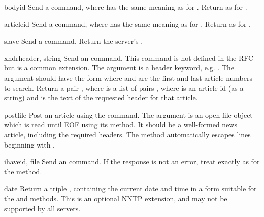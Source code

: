 \begin{methoddesc}{body}{id}
Send a  command, where  has the same meaning as for
.  Return as for .
\end{methoddesc}

\begin{methoddesc}{article}{id}
Send a  command, where  has the same meaning as
for .  Return as for .
\end{methoddesc}

\begin{methoddesc}{slave}{}
Send a  command.  Return the server's .
\end{methoddesc}

\begin{methoddesc}{xhdr}{header, string}
Send an  command.  This command is not defined in the RFC
but is a common extension.  The  argument is a header
keyword, e.g. .  The  argument should have
the form  where  and
 are the first and last article numbers to search.  Return a
pair , where  is a list of
pairs , where  is an article id
(as a string) and  is the text of the requested header for
that article.
\end{methoddesc}

\begin{methoddesc}{post}{file}
Post an article using the  command.  The 
argument is an open file object which is read until EOF using its
 method.  It should be a well-formed news article,
including the required headers.  The  method
automatically escapes lines beginning with .
\end{methoddesc}

\begin{methoddesc}{ihave}{id, file}
Send an  command.  If the response is not an error, treat
 exactly as for the  method.
\end{methoddesc}

\begin{methoddesc}{date}{}
Return a triple ,
containing the current date and time in a form suitable for the
 and  methods.
This is an optional NNTP extension, and may not be supported by all
servers.
\end{methoddesc}

